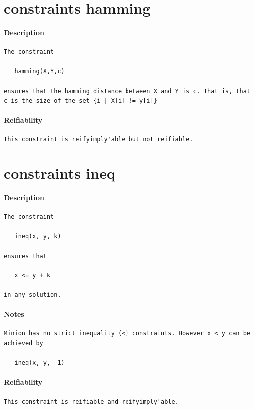 \documentclass[oneside]{book}
\begin{document}
\section{constraints hamming}
\paragraph{Description}
{\footnotesize
\begin{verbatim}
The constraint

   hamming(X,Y,c)

ensures that the hamming distance between X and Y is c. That is, that
c is the size of the set {i | X[i] != y[i]}
\end{verbatim}
}
\paragraph{Reifiability}
{\footnotesize
\begin{verbatim}
This constraint is reifyimply'able but not reifiable.
\end{verbatim}
}
\section{constraints ineq}
\paragraph{Description}
{\footnotesize
\begin{verbatim}
The constraint

   ineq(x, y, k)

ensures that 

   x <= y + k 

in any solution.
\end{verbatim}
}
\paragraph{Notes}
{\footnotesize
\begin{verbatim}
Minion has no strict inequality (<) constraints. However x < y can be
achieved by

   ineq(x, y, -1)
\end{verbatim}
}
\paragraph{Reifiability}
{\footnotesize
\begin{verbatim}
This constraint is reifiable and reifyimply'able.
\end{verbatim}
}
\end{document}
